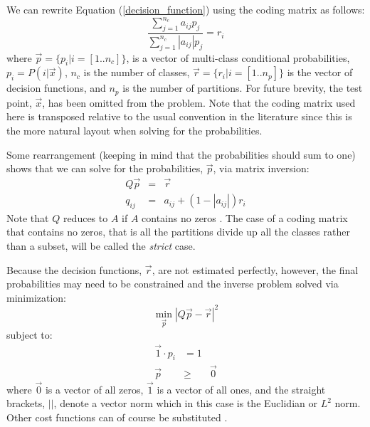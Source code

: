 We can rewrite Equation (\ref{decision_function}) using the coding 
matrix as follows:
\begin{equation}
	\frac{\sum_{j=1}^{n_c} a_{ij} p_j}{\sum_{j=1}^{n_c} |a_{ij}| p_j} = r_i
	\label{non_hier}
\end{equation}
where $\vec p=\lbrace p_i | i=[1..n_c]\rbrace$, 
is a vector of multi-class conditional probabilities, $p_i=P(i|\vec x)$, 
$n_c$ is the number of classes,
$\vec r=\lbrace r_i| i=[1..n_p]\rbrace$ 
is the vector of decision functions,
and
$n_p$ is the number of partitions.
For future brevity, the test point, $\vec x$, has been omitted from the problem. 
Note that the coding matrix used here is transposed relative to the usual
convention in the literature since this is the more natural layout when 
solving for the probabilities.

Some rearrangement (keeping in mind that the probabilities should sum to one)
shows that we can solve for the probabilities, $\vec p$, via matrix inversion:
\begin{eqnarray}
	Q \vec p & = & \vec r \label{basic_system}\\
	q_{ij} & = & a_{ij} + (1-|a_{ij}|) r_i 
	\label{matrix_equation2}
\end{eqnarray}
Note that $Q$ reduces to $A$ if $A$ contains no zeros \citep{Kong_Dietterich1997}.
The case of a coding matrix that contains no zeros, that is all the partitions divide up all the
classes rather than a subset, will be called the {\it strict} case.

Because the decision functions, $\vec r$, are not estimated perfectly, however,
the final probabilities may need to be constrained and the inverse
problem solved via minimization:
\begin{equation}
	\min_{\vec p} | Q \vec p - \vec r |^2 \label{minimization_problem}
\end{equation}
subject to:
\begin{eqnarray}
	\vec 1 \cdot p_i & = 1 \label{normalization}\\
	\vec p & \ge & \vec 0 \label{nonnegative}
\end{eqnarray}
where 
$\vec 0$ is a vector of all zeros,
$\vec 1$ is a vector of all ones,
and the straight brackets, $||$, denote a vector norm which  
in this case is the Euclidian or $L^2$ norm.
Other cost functions can of course be substituted \citep{Zadrozny2001}.

